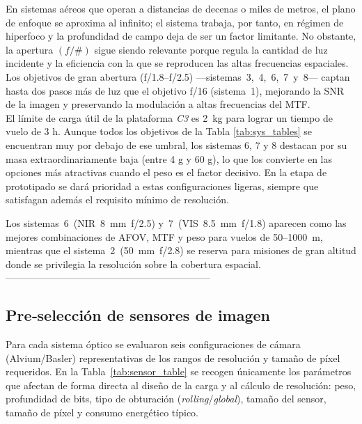 En sistemas aéreos que operan a distancias de decenas o miles de metros, el
plano de enfoque se aproxima al infinito; el sistema trabaja, por tanto, en
régimen de hiperfoco y la profundidad de campo deja de ser un factor
limitante.  No obstante, la apertura \((f/\#)\) sigue siendo relevante porque
regula la cantidad de luz incidente y la eficiencia con la que se reproducen
las altas frecuencias espaciales.  Los objetivos de gran abertura
(f/1.8–f/2.5) —sistemas 3, 4, 6, 7 y 8— captan hasta dos pasos más de luz que
el objetivo f/16 (sistema 1), mejorando la SNR de la imagen y preservando la
modulación a altas frecuencias del MTF.\\

El límite de carga útil de la plataforma \textit{C3} es 2 kg para lograr un tiempo de vuelo de 3 h. Aunque todos los objetivos de la Tabla \ref{tab:sys_tables} se encuentran muy por debajo de ese umbral, los sistemas 6, 7 y 8 destacan por su masa extraordinariamente baja (entre 4 g y 60 g), lo que los convierte en las opciones más atractivas cuando el peso es el factor decisivo. En la etapa de prototipado se dará prioridad a estas configuraciones ligeras, siempre que satisfagan además el requisito mínimo de resolución.


Los sistemas 6 (NIR 8 mm f/2.5) y 7 (VIS 8.5 mm f/1.8) aparecen
como las mejores combinaciones de AFOV, MTF y peso para vuelos de 50–1000 m,
mientras que el sistema 2 (50 mm f/2.8) se reserva para misiones de gran
altitud donde se privilegia la resolución sobre la cobertura espacial.\\




---------------------------------------------------------------
\subsection{Pre‑selección de sensores de imagen}
\label{sec:sensor_selection}
Para cada sistema óptico se evaluaron seis configuraciones de cámara
(Alvium/Basler) representativas de los rangos de resolución y tamaño de píxel
requeridos.  En la Tabla~\ref{tab:sensor_table} se recogen únicamente los
parámetros que afectan de forma directa al diseño de la carga y al cálculo de
resolución: peso, profundidad de bits, tipo de obturación
(\textit{rolling}/\textit{global}), tamaño del sensor, tamaño de píxel y
consumo energético típico.

